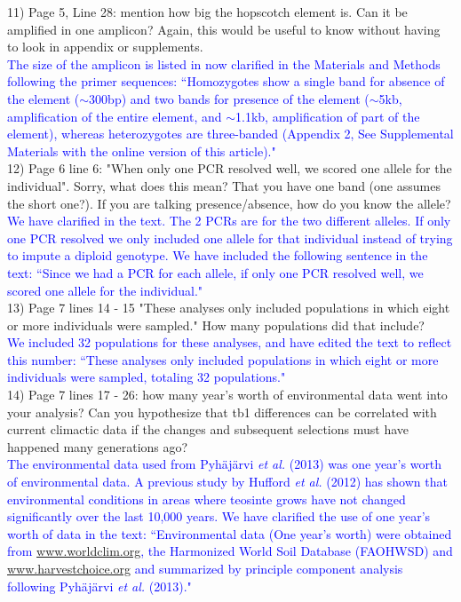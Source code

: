 \documentclass[11pt]{article}
\newcommand{\res}[1]{\noindent \textcolor{blue}{{#1}} \\}
\begin{document}

11) Page 5, Line 28: mention how big the hopscotch element is.  Can it be amplified in one amplicon? Again, this would be useful to know without having to look in appendix or supplements.\\

\res{The size of the amplicon is listed in now clarified in the Materials and Methods following the primer sequences: ``Homozygotes show a single band for absence of the element ($\sim$300bp) and two bands for presence of the element ($\sim$5kb, amplification of the entire element, and $\sim$1.1kb, amplification of part of the element), whereas heterozygotes are three-banded (Appendix 2, See Supplemental Materials with the online version of this article)."}

12) Page 6 line 6: "When only one PCR resolved well, we scored one allele for the individual".  Sorry, what does this mean? That you have one band (one assumes the short one?). If you are talking presence/absence, how do you know the allele?\\ 

\res{We have clarified in the text. The 2 PCRs are for the two different alleles. If only one PCR resolved we only included one allele for that individual instead of trying to impute a diploid genotype. We have included the following sentence in the text: ``Since we had a PCR for each allele, if only one PCR resolved well, we scored one allele for the individual."}

13) Page 7 lines 14 - 15 "These analyses only included populations in which eight or more individuals were sampled."  How many populations did that include?\\
 
\res{We included 32 populations for these analyses, and have edited the text to reflect this number: ``These analyses only included populations in which eight or more individuals were sampled, totaling 32 populations."}

14) Page 7 lines 17 - 26: how many year's worth of environmental data went into your analysis? Can you hypothesize that tb1 differences can be correlated with current climactic data if the changes and subsequent selections must have happened many generations ago?\\
 
\res{The environmental data used from Pyh\"aj\"arvi  \emph{et al.} (2013) was one year's worth of environmental data. A previous study by Hufford \emph{et al.} (2012) has shown that environmental conditions in areas where teosinte grows have not changed significantly over the last 10,000 years. We have clarified the use of one year's worth of data in the text: ``Environmental data (One year's worth) were obtained from \url{www.worldclim.org}, the Harmonized World Soil Database (FAOHWSD) and \url{www.harvestchoice.org} and summarized by principle component analysis following Pyh\"aj\"arvi  \emph{et al.} (2013)."}
\end{document}
